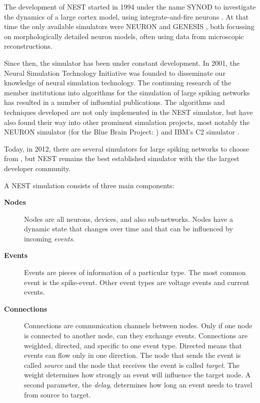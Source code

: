 \documentclass{article}
\begin{document}
The development of NEST started in 1994 under the name SYNOD to
investigate the dynamics of a large cortex model, using
integrate-and-fire neurons \citep{SYNOD}. At that time the only
available simulators were NEURON \citep{Hine:1997(1179)} and GENESIS
\citep{Bower95a}, both focussing on morphologically detailed neuron
models, often using data from microscopic reconstructions.

Since then, the simulator has been under constant development. In
2001, the Neural Simulation Technology Initiative was founded to
disseminate our knowledge of neural simulation technology. The
continuing research of the member institutions into algorithms for the
simulation of large spiking networks has resulted in a number of
influential publications. The algorithms and techniques developed are
not only implemented in the NEST simulator, but have also found their
way into other prominent simulation projects, most notably the NEURON
simulator (for the Blue Brain Project: \citealp{Migliore06_119}) and
IBM's C2 simulator \citep{Ananthanarayanan09}.

Today, in 2012, there are several simulators for large spiking
networks to choose from \citep{Brette2007}, but NEST remains the
best established simulator with the the largest developer
community.
  
A NEST simulation consists of three main components: 
\begin{description}
\item[\bf Nodes] Nodes are all neurons, devices, and also
  sub-networks. Nodes have a dynamic state that changes over time and
  that can be influenced by incoming \emph{events}.
\item[\bf Events] Events are pieces of information of a particular
  type. The most common event is the spike-event. Other event types
  are voltage events and current events.
\item[\bf Connections] Connections are communication channels between
  nodes. Only if one node is connected to another node, can they
  exchange events. Connections are weighted, directed, and specific to
  one event type. Directed means that events can flow only in one
  direction. The node that sends the event is called \emph{source} and
  the node that receives the event is called \emph{target}. The weight
  determines how strongly an event will influence the target node. A
  second parameter, the \emph{delay}, determines how long an event
  needs to travel from source to target.
\end{description}
\end{document}
